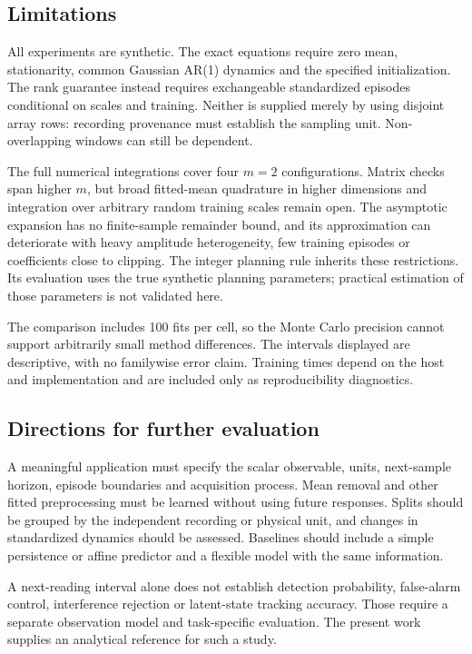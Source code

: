\documentclass[nolineno]{ieeeaccess}
\begin{document}
\subsection{Limitations}
All experiments are synthetic. The exact equations require zero mean, stationarity, common Gaussian AR(1) dynamics and the specified initialization. The rank guarantee instead requires exchangeable standardized episodes conditional on scales and training. Neither is supplied merely by using disjoint array rows: recording provenance must establish the sampling unit. Non-overlapping windows can still be dependent.

The full numerical integrations cover four $m=2$ configurations. Matrix checks span higher $m$, but broad fitted-mean quadrature in higher dimensions and integration over arbitrary random training scales remain open. The asymptotic expansion has no finite-sample remainder bound, and its approximation can deteriorate with heavy amplitude heterogeneity, few training episodes or coefficients close to clipping. The integer planning rule inherits these restrictions. Its evaluation uses the true synthetic planning parameters; practical estimation of those parameters is not validated here.

The comparison includes 100 fits per cell, so the Monte Carlo precision cannot support arbitrarily small method differences. The intervals displayed are descriptive, with no familywise error claim. Training times depend on the host and implementation and are included only as reproducibility diagnostics.

\subsection{Directions for further evaluation}
A meaningful application must specify the scalar observable, units, next-sample horizon, episode boundaries and acquisition process. Mean removal and other fitted preprocessing must be learned without using future responses. Splits should be grouped by the independent recording or physical unit, and changes in standardized dynamics should be assessed. Baselines should include a simple persistence or affine predictor and a flexible model with the same information.

A next-reading interval alone does not establish detection probability, false-alarm control, interference rejection or latent-state tracking accuracy. Those require a separate observation model and task-specific evaluation. The present work supplies an analytical reference for such a study.
\end{document}
